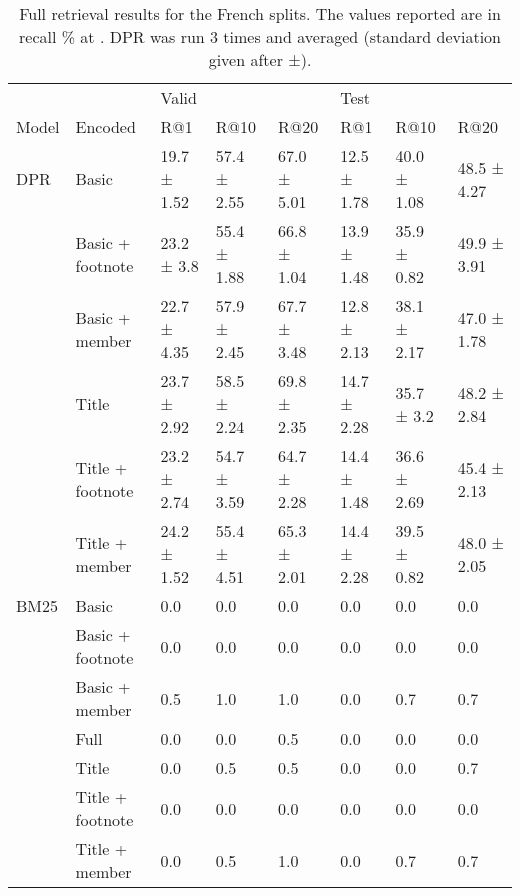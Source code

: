 \documentclass[11pt]{article}
\begin{document}
\begin{table*}[h]
    \small
    \centering
\begin{tabular}{llllllll}
\toprule
     &                & \multicolumn{3}{l}{Valid} & \multicolumn{3}{l}{Test} \\
Model & Encoded &          R@1 &         R@10 &         R@20 &          R@1 &         R@10 &         R@20 \\
\midrule
DPR & Basic &  19.7 ± 1.52 &  57.4 ± 2.55 &  67.0 ± 5.01 &  12.5 ± 1.78 &  40.0 ± 1.08 &  48.5 ± 4.27 \\
     & Basic + footnote &   23.2 ± 3.8 &  55.4 ± 1.88 &  66.8 ± 1.04 &  13.9 ± 1.48 &  35.9 ± 0.82 &  49.9 ± 3.91 \\
     & Basic + member &  22.7 ± 4.35 &  57.9 ± 2.45 &  67.7 ± 3.48 &  12.8 ± 2.13 &  38.1 ± 2.17 &  47.0 ± 1.78 \\
     & Title &  23.7 ± 2.92 &  58.5 ± 2.24 &  69.8 ± 2.35 &  14.7 ± 2.28 &   35.7 ± 3.2 &  48.2 ± 2.84 \\
     & Title + footnote &  23.2 ± 2.74 &  54.7 ± 3.59 &  64.7 ± 2.28 &  14.4 ± 1.48 &  36.6 ± 2.69 &  45.4 ± 2.13 \\
     & Title + member &  24.2 ± 1.52 &  55.4 ± 4.51 &  65.3 ± 2.01 &  14.4 ± 2.28 &  39.5 ± 0.82 &  48.0 ± 2.05 \\
\midrule
BM25 & Basic &          0.0 &          0.0 &          0.0 &          0.0 &          0.0 &          0.0 \\
     & Basic + footnote &          0.0 &          0.0 &          0.0 &          0.0 &          0.0 &          0.0 \\
     & Basic + member &          0.5 &          1.0 &          1.0 &          0.0 &          0.7 &          0.7 \\
     & Full &          0.0 &          0.0 &          0.5 &          0.0 &          0.0 &          0.0 \\
     & Title &          0.0 &          0.5 &          0.5 &          0.0 &          0.0 &          0.7 \\
     & Title + footnote &          0.0 &          0.0 &          0.0 &          0.0 &          0.0 &          0.0 \\
     & Title + member &          0.0 &          0.5 &          1.0 &          0.0 &          0.7 &          0.7 \\
\bottomrule
\end{tabular}
    \caption{Full retrieval results for the French splits. The values reported are in recall \% at . DPR was run 3 times and averaged (standard deviation given after ±).}
    \label{tab:full_retrieval_results_french}
\end{table*}
\end{document}
